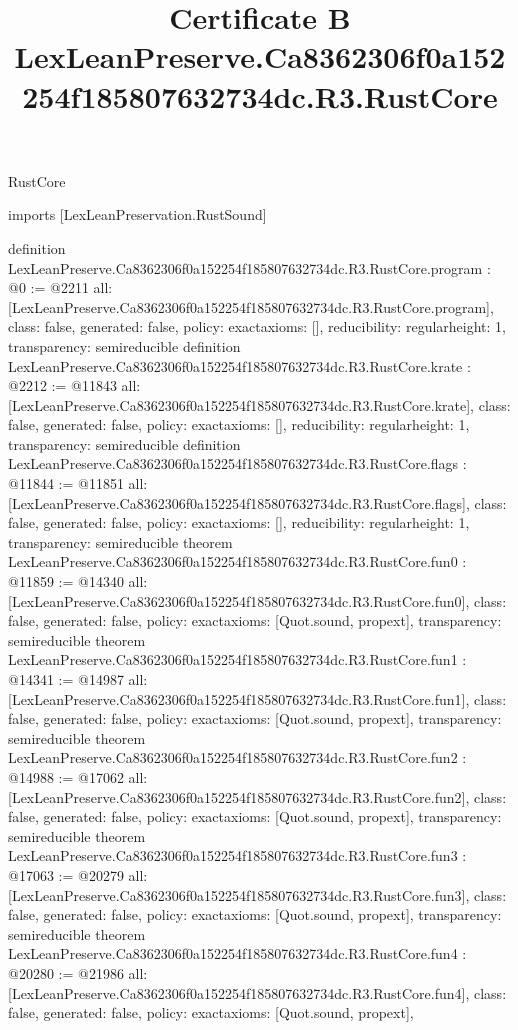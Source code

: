 \begin{lexlean}{RustCore}
\title{Certificate B LexLeanPreserve.Ca8362306f0a152254f185807632734dc.R3.RustCore}
\begin{coremodule}
imports [LexLeanPreservation.RustSound]

definition LexLeanPreserve.Ca8362306f0a152254f185807632734dc.R3.RustCore.program : @0 := @2211 {
  all: [LexLeanPreserve.Ca8362306f0a152254f185807632734dc.R3.RustCore.program],
  class: false,
  generated: false,
  policy: exact{axioms: []},
  reducibility: regular{height: 1},
  transparency: semireducible
}
definition LexLeanPreserve.Ca8362306f0a152254f185807632734dc.R3.RustCore.krate : @2212 := @11843 {
  all: [LexLeanPreserve.Ca8362306f0a152254f185807632734dc.R3.RustCore.krate],
  class: false,
  generated: false,
  policy: exact{axioms: []},
  reducibility: regular{height: 1},
  transparency: semireducible
}
definition LexLeanPreserve.Ca8362306f0a152254f185807632734dc.R3.RustCore.flags : @11844 := @11851 {
  all: [LexLeanPreserve.Ca8362306f0a152254f185807632734dc.R3.RustCore.flags],
  class: false,
  generated: false,
  policy: exact{axioms: []},
  reducibility: regular{height: 1},
  transparency: semireducible
}
theorem LexLeanPreserve.Ca8362306f0a152254f185807632734dc.R3.RustCore.fun0 : @11859 := @14340 {
  all: [LexLeanPreserve.Ca8362306f0a152254f185807632734dc.R3.RustCore.fun0],
  class: false,
  generated: false,
  policy: exact{axioms: [Quot.sound, propext]},
  transparency: semireducible
}
theorem LexLeanPreserve.Ca8362306f0a152254f185807632734dc.R3.RustCore.fun1 : @14341 := @14987 {
  all: [LexLeanPreserve.Ca8362306f0a152254f185807632734dc.R3.RustCore.fun1],
  class: false,
  generated: false,
  policy: exact{axioms: [Quot.sound, propext]},
  transparency: semireducible
}
theorem LexLeanPreserve.Ca8362306f0a152254f185807632734dc.R3.RustCore.fun2 : @14988 := @17062 {
  all: [LexLeanPreserve.Ca8362306f0a152254f185807632734dc.R3.RustCore.fun2],
  class: false,
  generated: false,
  policy: exact{axioms: [Quot.sound, propext]},
  transparency: semireducible
}
theorem LexLeanPreserve.Ca8362306f0a152254f185807632734dc.R3.RustCore.fun3 : @17063 := @20279 {
  all: [LexLeanPreserve.Ca8362306f0a152254f185807632734dc.R3.RustCore.fun3],
  class: false,
  generated: false,
  policy: exact{axioms: [Quot.sound, propext]},
  transparency: semireducible
}
theorem LexLeanPreserve.Ca8362306f0a152254f185807632734dc.R3.RustCore.fun4 : @20280 := @21986 {
  all: [LexLeanPreserve.Ca8362306f0a152254f185807632734dc.R3.RustCore.fun4],
  class: false,
  generated: false,
  policy: exact{axioms: [Quot.sound, propext]},
}
\end{coremodule}
\end{lexlean}
